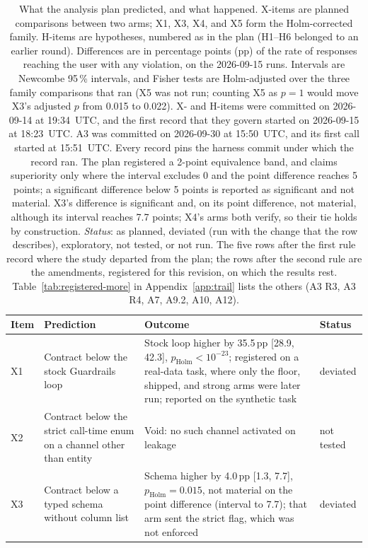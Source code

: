 \documentclass[journal]{IEEEtran}
\begin{document}
\begin{table}[!tp]
\caption{What the analysis plan predicted, and what happened. X-items are
planned comparisons between two arms; X1, X3, X4, and X5 form the
Holm-corrected family. H-items are hypotheses, numbered as in the plan (H1--H6
belonged to an earlier round). Differences are in percentage points (pp) of
the rate of responses reaching the user with any violation, on the 2026-09-15
runs. Intervals are Newcombe 95\,\% intervals, and Fisher tests are
Holm-adjusted over the three family comparisons that ran (X5 was not run;
counting X5 as $p=1$ would move X3's adjusted $p$ from 0.015 to 0.022). X- and H-items were committed on
2026-09-14 at 19:34~UTC, and the first record that they govern started on
2026-09-15 at 18:23~UTC. A3 was committed on 2026-09-30 at 15:50~UTC, and its
first call started at 15:51~UTC. Every record pins the harness commit under
which the record ran. The plan registered a 2-point equivalence band, and
claims superiority only where the interval excludes 0 and the point difference
reaches 5 points; a significant difference below 5 points is reported as
significant and not material. X3's difference is significant and, on its point
difference, not material, although its interval reaches 7.7 points; X4's arms
both verify, so their tie holds by construction. \emph{Status}: as planned, deviated (run
with the change that the row describes), exploratory, not tested, or not run.
The five rows after the first rule record where the study departed from the
plan; the rows after the second rule are the amendments, registered for this
revision, on which the results rest. Table~\ref{tab:registered-more} in
Appendix~\ref{app:trail} lists the others (A3 R3, A3 R4, A7, A9.2, A10,
A12).}
\label{tab:registered}
\centering
\footnotesize
\setlength{\tabcolsep}{2.4pt}
\begin{tabular}{@{}lp{5.4cm}p{8.9cm}l@{}}
\toprule
Item & Prediction & Outcome & Status \\
\midrule
X1 & Contract below the stock Guardrails loop & Stock loop higher by 35.5\,pp [28.9, 42.3], $p_{\mathrm{Holm}}<10^{-23}$; registered on a real-data task, where only the floor, shipped, and strong arms were later run; reported on the synthetic task & deviated \\
X2 & Contract below the strict call-time enum on a channel other than entity & Void: no such channel activated on leakage & not tested \\
X3 & Contract below a typed schema without column list & Schema higher by 4.0\,pp [1.3, 7.7], $p_{\mathrm{Holm}}=0.015$, not material on the point difference (interval to 7.7); that arm sent the strict flag, which was not enforced & deviated \\

\end{tabular}
\end{table}
\end{document}
